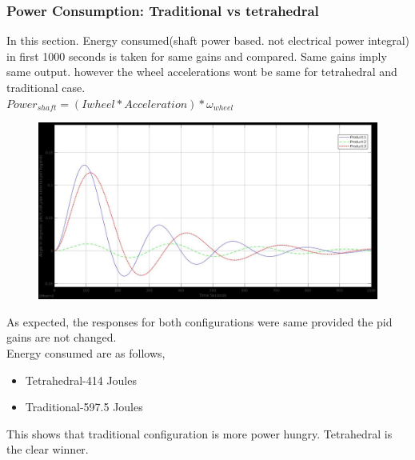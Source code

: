 \documentclass[10pt,a4paper]{report}
\begin{document}
\subsubsection{Power Consumption: Traditional vs tetrahedral}
In this section. Energy consumed(shaft power based. not electrical power integral) in first 1000 seconds is taken for same gains and compared. Same gains imply same output. however the wheel accelerations wont be same for tetrahedral and traditional case.\\
$ Power_{shaft}=(Iwheel*Acceleration)*\omega_{wheel} $
\begin{figure}[H]
	\centering
	\includegraphics[width=1.0\linewidth]{simulation_at_constantTOrq_pryangles}
	\caption{}
	\label{fig:simulationatconstanttorqpryangles}
\end{figure}
As expected, the responses for both configurations were same provided the pid gains are not changed.\\
Energy consumed are as follows,\\
\begin{itemize}
	\item Tetrahedral-414 Joules
	\item Traditional-597.5 Joules
\end{itemize}
This shows that traditional configuration is more power hungry. Tetrahedral is the clear winner.
\end{document}
